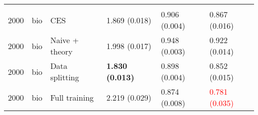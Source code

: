 \begin{tabular}[t]{rlllll}
\addlinespace[0.3em]
\multicolumn{6}{l}{\textbf{2000}}\\
\hspace{1em}2000 & bio & CES & 1.869 (0.018) & 0.906 (0.004) & 0.867 (0.016)\\
\hspace{1em}2000 & bio & Naive + theory & 1.998 (0.017) & 0.948 (0.003) & 0.922 (0.014)\\
\hspace{1em}2000 & bio & Data splitting & \textbf{1.830 (0.013)} & 0.898 (0.004) & 0.852 (0.015)\\
\hspace{1em}2000 & bio & Full training & 2.219 (0.029) & 0.874 (0.008) & \textcolor{red}{0.781 (0.035)}\\
\bottomrule
\end{tabular}

